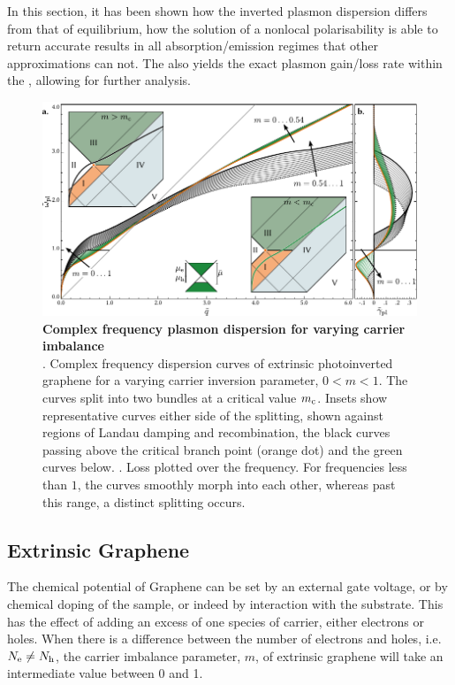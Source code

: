 In this section, it has been shown how the inverted plasmon dispersion differs
from that of equilibrium, how the \cfpd solution of a nonlocal \rpa
polarisability is able to return accurate results in all absorption/emission
regimes that other approximations can not.
The \cfpd also yields the exact plasmon gain/loss rate within the \rpa, allowing
for further analysis.

\begin{figure}
 \includegraphics{figs/gr/Mparam.pdf}
 \caption[Complex frequency plasmon dispersion for varying carrier imbalance]{
 \label{fig:Mparam}
 \textbf{Complex frequency plasmon dispersion for varying carrier imbalance}
 \small\\
\subA. Complex frequency dispersion curves of extrinsic photoinverted graphene
for a varying carrier inversion parameter, $0 < m < 1$.
The curves split into two bundles at a critical value $m_\mathrm{c}$.
Insets show representative curves either side of the splitting, shown against
regions of Landau damping and recombination, the black curves passing above the
critical branch point (orange dot) and the green curves below.
\subB. Loss plotted over the frequency.
For frequencies less than $1$, the curves smoothly morph into each other,
whereas past this range, a distinct splitting occurs.
}
\end{figure}

\subsection{Extrinsic Graphene}
The chemical potential of Graphene can be set by an external gate voltage, or by
chemical doping of the sample, or indeed by interaction with the substrate.
This has the effect of adding an excess of one species of carrier, either
electrons or holes.
When there is a difference between the number of electrons and
holes, i.e. ${N}_\mathrm{e} \neq {N}_\mathrm{h}$, the carrier imbalance parameter, $m$, of extrinsic
graphene will take an intermediate value between 0 and 1.

